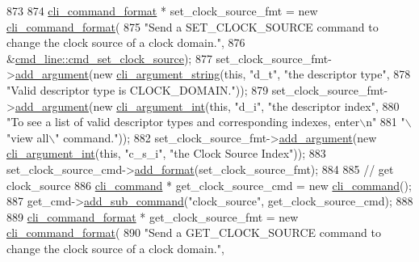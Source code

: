 \begin{DoxyCode}
873 
874     \hyperlink{classcli__command__format}{cli\_command\_format} * set\_clock\_source\_fmt = \textcolor{keyword}{new} 
      \hyperlink{classcli__command__format}{cli\_command\_format}(
875         \textcolor{stringliteral}{"Send a SET\_CLOCK\_SOURCE command to change the clock source of a clock domain."},
876         &\hyperlink{classcmd__line_a73d334537ebbccbe0807b12b0c8019ee}{cmd\_line::cmd\_set\_clock\_source});
877     set\_clock\_source\_fmt->\hyperlink{classcli__command__format_ac3fc6d13a227c195d5ee6f7b78eba9cd}{add\_argument}(\textcolor{keyword}{new} \hyperlink{classcli__argument__string}{cli\_argument\_string}(\textcolor{keyword}{this}, \textcolor{stringliteral}{"d\_t"}, \textcolor{stringliteral}{
      "the descriptor type"},
878                                                                \textcolor{stringliteral}{"Valid descriptor type is CLOCK\_DOMAIN."}));
879     set\_clock\_source\_fmt->\hyperlink{classcli__command__format_ac3fc6d13a227c195d5ee6f7b78eba9cd}{add\_argument}(\textcolor{keyword}{new} \hyperlink{classcli__argument__int}{cli\_argument\_int}(\textcolor{keyword}{this}, \textcolor{stringliteral}{"d\_i"}, \textcolor{stringliteral}{"the
       descriptor index"},
880                                                             \textcolor{stringliteral}{"To see a list of valid descriptor types and
       corresponding indexes, enter\(\backslash\)n"}
881                                                             \textcolor{stringliteral}{"\(\backslash\)"view all\(\backslash\)" command."}));
882     set\_clock\_source\_fmt->\hyperlink{classcli__command__format_ac3fc6d13a227c195d5ee6f7b78eba9cd}{add\_argument}(\textcolor{keyword}{new} \hyperlink{classcli__argument__int}{cli\_argument\_int}(\textcolor{keyword}{this}, \textcolor{stringliteral}{"c\_s\_i"}, \textcolor{stringliteral}{"the
       Clock Source Index"}));
883     set\_clock\_source\_cmd->\hyperlink{classcli__command_aa9ec38e761644d946f8db2b920e39921}{add\_format}(set\_clock\_source\_fmt);
884 
885     \textcolor{comment}{// get clock\_source}
886     \hyperlink{classcli__command}{cli\_command} * get\_clock\_source\_cmd = \textcolor{keyword}{new} \hyperlink{classcli__command}{cli\_command}();
887     get\_cmd->\hyperlink{classcli__command_aa73a67e8ebb6facd4b40ced66279b226}{add\_sub\_command}(\textcolor{stringliteral}{"clock\_source"}, get\_clock\_source\_cmd);
888 
889     \hyperlink{classcli__command__format}{cli\_command\_format} * get\_clock\_source\_fmt = \textcolor{keyword}{new} 
      \hyperlink{classcli__command__format}{cli\_command\_format}(
890         \textcolor{stringliteral}{"Send a GET\_CLOCK\_SOURCE command to change the clock source of a clock domain."},

\end{DoxyCode}
